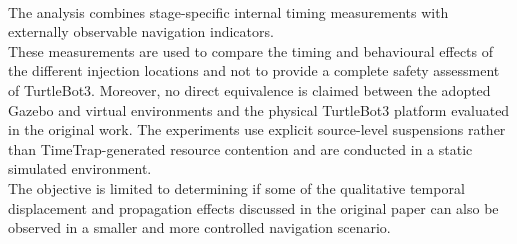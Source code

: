 \\
The analysis combines stage-specific internal timing measurements with externally observable navigation indicators.
\\
These measurements are used to compare the timing and behavioural effects of the different injection locations and not to provide a complete safety assessment of TurtleBot3. Moreover, no direct equivalence is claimed between the adopted Gazebo and virtual environments and the physical TurtleBot3 platform evaluated in the original work. The experiments use explicit source-level suspensions rather than TimeTrap-generated resource contention and are conducted in a static simulated environment.
\\
The objective is limited to determining if some of the qualitative temporal displacement and propagation effects discussed in the original paper can also be observed in a smaller and more controlled navigation scenario.
